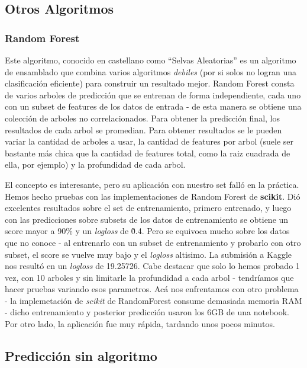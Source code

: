 
\subsection{Otros Algoritmos} %
\label{sub:otros_algoritmos}

\subsubsection{Random Forest} %
\label{ssub:random_forest}

Este algoritmo, conocido en castellano como ``Selvas Aleatorias'' es un algoritmo de ensamblado que combina varios algoritmos \textit{debiles} (por si solos no logran una clasificación eficiente) para construir un resultado mejor. Random Forest consta de varios arboles de predicción que se entrenan de forma independiente, cada uno con un subset de features de los datos de entrada - de esta manera se obtiene una colección de arboles no correlacionados. Para obtener la predicción final, los resultados de cada arbol se promedian. Para obtener resultados se le pueden variar la cantidad de arboles a usar, la cantidad de features por arbol (suele ser bastante más chica que la cantidad de features total, como la raiz cuadrada de ella, por ejemplo) y la profundidad de cada arbol.

El concepto es interesante, pero su aplicación con nuestro set falló en la práctica. Hemos hecho pruebas con las implementaciones de Random Forest de \textbf{scikit}. Dió excelentes resultados sobre el set de entrenamiento, primero entrenado, y luego con las predicciones sobre subsets de los datos de entrenamiento se obtiene un score mayor a 90\% y un \textit{logloss} de \~0.4. Pero se equivoca mucho sobre los datos que no conoce - al entrenarlo con un subset de entrenamiento y probarlo con otro subset, el score se vuelve muy bajo y el \textit{logloss} altisimo. La submisión a Kaggle nos resultó en un \textit{logloss} de 19.25726. Cabe destacar que solo lo hemos probado 1 vez, con 10 arboles y sin limitarle la profundidad a cada arbol - tendríamos que hacer pruebas variando esos parametros. Acá nos enfrentamos con otro problema - la implemetación de \textit{scikit} de RandomForest consume demasiada memoria RAM - dicho entrenamiento y posterior predicción usaron los 6GB de una notebook. Por otro lado, la aplicación fue muy rápida, tardando unos pocos minutos.


\subsection{Predicción sin algoritmo} %
\label{sub:prediccion_sin_algoritmo}

